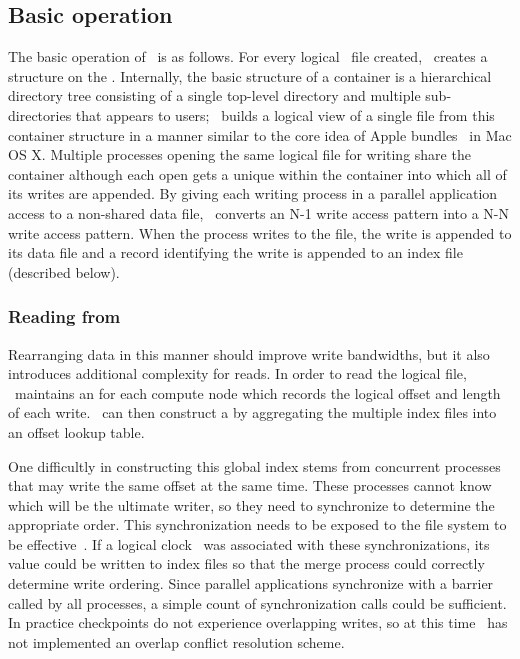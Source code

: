 \subsection{Basic operation}
The basic operation of \plfs\ is as follows. For every logical \plfs\ file
created, \plfs\ creates a  structure on the \upfs. Internally,
the basic structure of a container is a hierarchical directory tree consisting
of a single top-level directory and multiple sub-directories that appears to
users; \plfs\ builds a logical view of a single file from this container
structure in a manner similar to the core idea of Apple
bundles~\cite{bundles} in Mac OS X.  Multiple processes opening the same
logical file for writing share the container although each open gets a unique
 within the container into which all of its writes are
appended. By giving each writing process in a parallel application access to a
non-shared data file, \plfs\ converts an N-1 write access pattern into a N-N
write access pattern.  When the process writes to the file, the write is
appended to its data file and a record identifying the write is appended to an
index file (described below). 


\subsubsection{Reading from \plfs}
\label{arch-read}
Rearranging data in this manner should improve write bandwidths, but
it also introduces additional complexity for reads. In order to read 
the logical file, \plfs\ maintains an  for each compute
node which records the logical offset and length of each write. \plfs\ can
then construct a  by aggregating the multiple index files 
into an offset lookup table.

One difficultly in constructing this global index stems from concurrent
processes that may write the same offset at the same time.  These processes
cannot know which will be the ultimate writer, so they need to synchronize to
determine the appropriate order. This synchronization needs to be exposed to
the file system to be effective~\cite{Gibson95thescotch}. If a logical
clock~\cite{lamport1978} was associated with these synchronizations, its value
could be written to index files so that the merge process could correctly
determine write ordering. Since parallel applications synchronize with a
barrier called by all processes, a simple count of synchronization calls could
be sufficient. In practice checkpoints do not experience overlapping writes, so
at this time \plfs\ has not implemented an overlap conflict resolution scheme.


